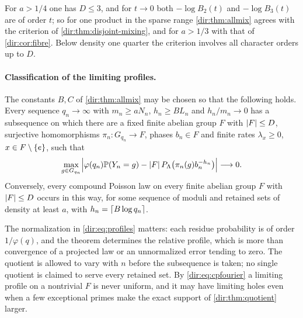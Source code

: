 For $a>1/4$ one has $D\le3$, and for $t\to0$ both $-\log B_2(t)$ and $-\log B_3(t)$ are of order $t$; so
for one product in the sparse range \cref{dir:thm:allmix} agrees with the criterion of
\cref{dir:thm:disjoint-mixing}, and for $a>1/3$ with that of \cref{dir:cor:fibre}. Below density one quarter
the criterion involves all character orders up to $D$.

\paragraph{Classification of the limiting profiles.}

\begin{theorem}\label{dir:thm:profiles}
The constants $B,C$ of \cref{dir:thm:allmix} may be chosen so that the following holds. Every sequence
$q_n\to\infty$ with $m_n\ge aN_n$, $h_n\ge BL_n$ and $h_n/m_n\to0$ has a subsequence on which there are a
fixed finite abelian group $F$ with $\lvert F\rvert\le D$, surjective homomorphisms $\pi_n\colon G_{q_n}\to F$,
phases $b_n\in F$ and finite rates $\lambda_x\ge0$, $x\in F\setminus\{e\}$, such that
\begin{equation}\label{dir:eq:profiles}
 \max_{g\in G_{q_n}}\Bigl|\varphi(q_n)\mathbb{P}(Y_n=g)-\lvert F\rvert\,P_\Lambda\bigl(\pi_n(g)b_n^{-h_n}\bigr)\Bigr|\longrightarrow0 .
\end{equation}
Conversely, every compound Poisson law on every finite abelian group $F$ with $\lvert F\rvert\le D$ occurs in this
way, for some sequence of moduli and retained sets of density at least $a$, with $h_n=\lceil B\log q_n\rceil$.
\end{theorem}

The normalization in \eqref{dir:eq:profiles} matters: each residue probability is of order $1/\varphi(q)$,
and the theorem determines the relative profile, which is more than convergence of a projected law or an
unnormalized error tending to zero. The quotient is allowed to vary with $n$ before the subsequence is
taken; no single quotient is claimed to serve every retained set. By \eqref{dir:eq:cpfourier} a limiting
profile on a nontrivial $F$ is never uniform, and it may have limiting holes even when a few exceptional
primes make the exact support of \cref{dir:thm:quotient} larger.

